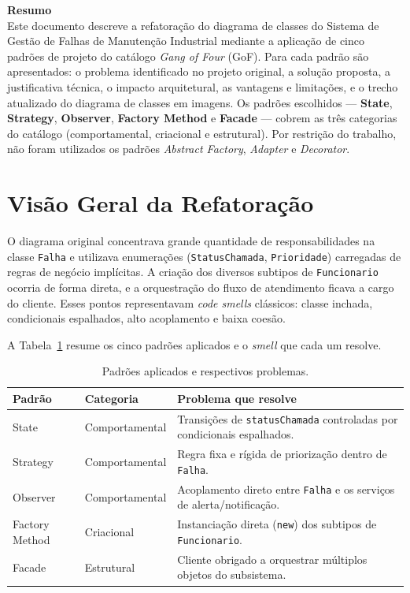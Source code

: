 \documentclass[10pt]{article}
\begin{document}
\textbf{\Huge Resumo} 
\\
\linebreak
Este documento descreve a refatoração do diagrama de classes do
Sistema de Gestão de Falhas de Manutenção Industrial mediante a aplicação de
cinco padrões de projeto do catálogo \textit{Gang of Four} (GoF). Para cada
padrão são apresentados: o problema identificado no projeto original, a solução
proposta, a justificativa técnica, o impacto arquitetural, as vantagens e
limitações, e o trecho atualizado do diagrama de classes em imagens. Os
padrões escolhidos --- \textbf{State}, \textbf{Strategy}, \textbf{Observer},
\textbf{Factory Method} e \textbf{Facade} --- cobrem as três categorias do
catálogo (comportamental, criacional e estrutural). Por restrição do trabalho,
não foram utilizados os padrões \textit{Abstract Factory}, \textit{Adapter} e
\textit{Decorator}.

\newpage
\tableofcontents  

\newpage
\section{Visão Geral da Refatoração}

O diagrama original concentrava grande quantidade de responsabilidades na classe
\texttt{Falha} e utilizava enumerações (\texttt{StatusChamada},
\texttt{Prioridade}) carregadas de regras de negócio implícitas. A criação dos
diversos subtipos de \texttt{Funcionario} ocorria de forma direta, e a
orquestração do fluxo de atendimento ficava a cargo do cliente. Esses pontos
representavam \textit{code smells} clássicos: classe inchada, condicionais
espalhados, alto acoplamento e baixa coesão.

A Tabela~\ref{tab:padroes} resume os cinco padrões aplicados e o
\textit{smell} que cada um resolve.

\begin{table}[h]
\centering
\begin{tabular}{|l|l|p{7cm}|}
\hline
\textbf{Padrão} & \textbf{Categoria} & \textbf{Problema que resolve} \\
\hline
State & Comportamental & Transições de \texttt{statusChamada} controladas por condicionais espalhados. \\
\hline
Strategy & Comportamental & Regra fixa e rígida de priorização dentro de \texttt{Falha}. \\
\hline
Observer & Comportamental & Acoplamento direto entre \texttt{Falha} e os serviços de alerta/notificação. \\
\hline
Factory Method & Criacional & Instanciação direta (\texttt{new}) dos subtipos de \texttt{Funcionario}. \\
\hline
Facade & Estrutural & Cliente obrigado a orquestrar múltiplos objetos do subsistema. \\
\hline
\end{tabular}
\caption{Padrões aplicados e respectivos problemas.}
\label{tab:padroes}
\end{table}
\end{document}
